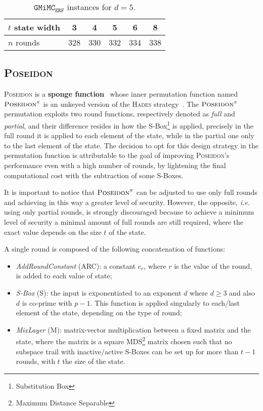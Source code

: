 \documentclass[12pt, a4paper]{report}
\begin{document}
\begin{table}[H]
  \caption{$\texttt{GMiMC}_\texttt{ERF}$ instances for $d = 5$.}\label{tab:gmimcinstances}
  \begin{center}
    \begin{tabular}{|l|c|c|c|c|c|}
      \hline
      $t$ state width & 3 & 4 & 5 & 6 & 8 \\
      \hline
      $n$ rounds & 328 & 330 & 332 & 334 & 338 \\
      \hline
    \end{tabular}
  \end{center}
\end{table}
\subsection{\textsc{Poseidon}}\label{subsec:poseidon}

\textsc{Poseidon} is a \textbf{sponge function}~\cite{sponge} whose inner permutation function named $\textsc{Poseidon}^\pi$ is an unkeyed version of the \textsc{Hades} strategy~\cite{hades}.
The $\textsc{Poseidon}^\pi$ permutation exploits two round functions, respectively denoted as \textit{full} and \textit{partial}, and their difference resides in how the S-Box\footnote{Substitution Box} is applied, precisely in the full round it is applied to each element of the state, while in the partial one only to the last element of the state. 
The decision to opt for this design strategy in the permutation function is attributable to the goal of improving \textsc{Poseidon}'s performance even with a high number of rounds, by lightening the final computational cost with the subtraction of some S-Boxes.
\begin{note}
It is important to notice that $\textsc{Poseidon}^\pi$ can be adjusted to use only full rounds and achieving in this way a greater level of security.
However, the opposite, \textsl{i.e.} using only partial rounds, is strongly discouraged because to achieve a minimum level of security a minimal amount of full rounds are still required, where the exact value depends on the size $t$ of the state.
\end{note}

A single round is composed of the following concatenation of functions:
\begin{itemize}
  \item \textit{AddRoundConstant} (ARC): a constant $c_r$, where $r$ is the value of the round, is added to each value of state;
  \item \textit{S-Box} (S): the input is exponentiated to an exponent $d$ where $d \ge 3$ and also $d$ is co-prime with $p-1$. This function is applied singularly to each/last element of the state, depending on the type of round;
  \item \textit{MixLayer} (M): matrix-vector multiplication between a fixed matrix and the state, where the matrix is a square MDS\footnote{Maximum Distance Separable} matrix chosen such that no subspace trail with inactive/active S-Boxes can be set up for more than $t-1$ rounds, with $t$ the size of the state.
\end{itemize}
\end{document}
